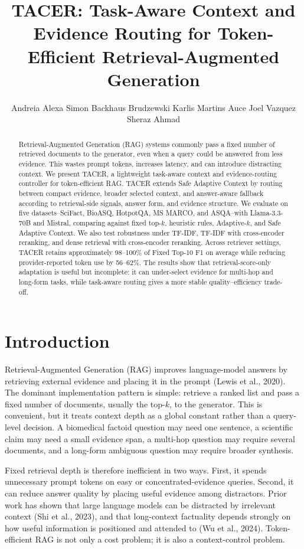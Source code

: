 \documentclass[11pt]{article}
\title{TACER: Task-Aware Context and Evidence Routing for Token-Efficient Retrieval-Augmented Generation}
\author{Andreia Alexa \And Simon Backhaus Brudzewski \And Karlis Martins Auce \AND Joel Vazquez \And Sheraz Ahmad}
\begin{document}
\maketitle

\begin{abstract}
Retrieval-Augmented Generation (RAG) systems commonly pass a fixed number of retrieved documents to the generator, even when a query could be answered from less evidence. This wastes prompt tokens, increases latency, and can introduce distracting context. We present TACER, a lightweight task-aware context and evidence-routing controller for token-efficient RAG. TACER extends Safe Adaptive Context by routing between compact evidence, broader selected context, and answer-aware fallback according to retrieval-side signals, answer form, and evidence structure. We evaluate on five datasets--SciFact, BioASQ, HotpotQA, MS MARCO, and ASQA--with Llama-3.3-70B and Mistral, comparing against fixed top-$k$, heuristic rules, Adaptive-$k$, and Safe Adaptive Context. We also test robustness under TF-IDF, TF-IDF with cross-encoder reranking, and dense retrieval with cross-encoder reranking. Across retriever settings, TACER retains approximately 98--100\% of Fixed Top-10 F1 on average while reducing provider-reported token use by 56--62\%. The results show that retrieval-score-only adaptation is useful but incomplete: it can under-select evidence for multi-hop and long-form tasks, while task-aware routing gives a more stable quality--efficiency trade-off.
\end{abstract}

\section{Introduction}

Retrieval-Augmented Generation (RAG) improves language-model answers by retrieving external evidence and placing it in the prompt (Lewis et al., 2020). The dominant implementation pattern is simple: retrieve a ranked list and pass a fixed number of documents, usually the top-$k$, to the generator. This is convenient, but it treats context depth as a global constant rather than a query-level decision. A biomedical factoid question may need one sentence, a scientific claim may need a small evidence span, a multi-hop question may require several documents, and a long-form ambiguous question may require broader synthesis.

Fixed retrieval depth is therefore inefficient in two ways. First, it spends unnecessary prompt tokens on easy or concentrated-evidence queries. Second, it can reduce answer quality by placing useful evidence among distractors. Prior work has shown that large language models can be distracted by irrelevant context (Shi et al., 2023), and that long-context factuality depends strongly on how useful information is positioned and attended to (Wu et al., 2024). Token-efficient RAG is not only a cost problem; it is also a context-control problem.
\end{document}
